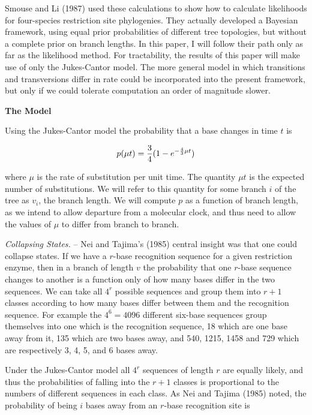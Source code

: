 Smouse and Li (1987) used these calculations to show how to calculate
likelihoods for four-species restriction site phylogenies.  They actually
developed a
Bayesian framework, using equal prior probabilities of different tree
topologies, but without a complete prior on branch lengths.  In this paper,
I will follow their path only as far as the
likelihood method.  For tractability, the results of this paper will make 
use of only the Jukes-Cantor model.  The more general model in which
transitions and transversions differ in rate could be
incorporated into the present framework, but only if we could tolerate
computation an order of magnitude slower.
\bigskip

\centerline{\bf The Model}

Using the Jukes-Cantor model the probability that a base changes in time $t$
is

\begin{equation} %
p(\mu t)  =  {3 \over 4} (1 - e^{ - {4 \over 3} \mu t})
\end{equation}

where $\mu$ is the rate of substitution per unit time.  The quantity $\mu t$ is
the expected number of substitutions.  We will refer to this quantity for
some branch $i$ of the tree as $v_i$, the branch length.  We will compute
$p$ as a function of branch length, as we intend to allow departure from a
molecular clock, and thus need to allow the values of $\mu$ to differ from
branch to branch.

{\it Collapsing States.} --  Nei and Tajima's (1985) central insight was that one
could collapse states.  If we have a $r$-base recognition sequence for a given
restriction enzyme, then in a branch of length $v$
the probability that one $r$-base sequence changes to another is a function
only of how many bases differ in the two sequences.  We can take all $4^r$
possible sequences and group them into $r+1$ classes according to how many
bases differ between them and the recognition sequence.  For example the
$4^6 = 4096$ different six-base sequences group themselves into one which is
the recognition sequence, 18 which are one base away from it, 135 which are
two bases away, and 540, 1215, 1458 and 729 which are respectively 3, 4, 5,
and 6 bases away.

Under the Jukes-Cantor model all $4^r$ sequences of length $r$
are equally likely, and thus
the probabilities of falling into the $r+1$ classes is proportional to the
numbers of different sequences in each class.  As Nei and Tajima (1985) noted,
the probability of being $i$
bases away from an $r$-base recognition site is

